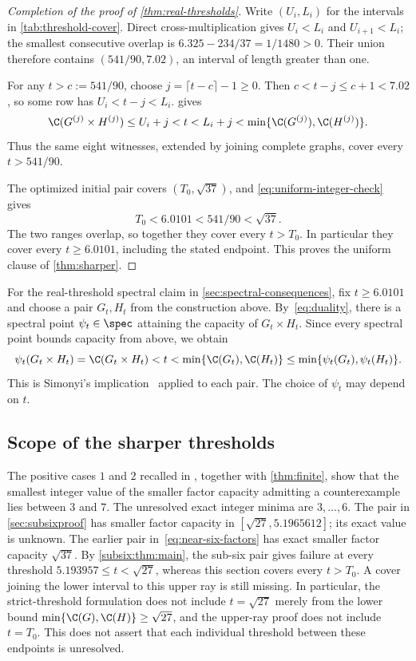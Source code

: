 \FloatBarrier
\begin{proof}[Completion of the proof of \cref{thm:real-thresholds}]
Write $(U_i,L_i)$ for the intervals in
\cref{tab:threshold-cover}. Direct cross-multiplication gives
$U_i<L_i$ and $U_{i+1}<L_i$; the smallest consecutive overlap
is $6.325-234/37=1/1480>0$. Their union therefore contains
$(541/90,7.02)$, an interval of length greater than one.

For any $t>c:=541/90$, choose $j=\lceil t-c\rceil-1\ge0$.
Then $c<t-j\le c+1<7.02$, so some row has $U_i<t-j<L_i$.
 gives
\[
 \C(G^{(j)}\times H^{(j)})\le U_i+j<t<L_i+j
 <\min\{\C(G^{(j)}),\C(H^{(j)})\}.
\]
Thus the same eight witnesses, extended by joining complete graphs,
cover every $t>541/90$.

The optimized initial pair covers $(T_0,\sqrt{37})$, and
\eqref{eq:uniform-integer-check} gives
\[
 T_0<6.0101<541/90<\sqrt{37}.
\]
The two ranges overlap, so together they cover every $t>T_0$.
In particular they cover every $t\ge6.0101$, including the stated
endpoint. This proves the uniform clause of \cref{thm:sharper}.
\end{proof}

For the real-threshold spectral claim in \cref{sec:spectral-consequences}, fix
$t\ge6.0101$ and choose a pair $G_t,H_t$ from the construction above.
By~\eqref{eq:duality}, there is a spectral point $\psi_t\in\spec$
attaining the capacity of $G_t\times H_t$. Since every spectral point
bounds capacity from above, we obtain
\[
 \psi_t(G_t\times H_t)=\C(G_t\times H_t)<t
 <\min\{\C(G_t),\C(H_t)\}
 \le\min\{\psi_t(G_t),\psi_t(H_t)\}.
\]
This is Simonyi's implication~\cite[Thm.~8]{Simonyi} applied to each
pair. The choice of $\psi_t$ may depend on $t$.

\subsection{Scope of the sharper thresholds}

The positive cases $1$ and $2$ recalled in ,
together with \cref{thm:finite}, show that the smallest integer value of
the smaller factor capacity admitting a counterexample lies between
$3$ and $7$. The unresolved exact integer minima are $3,\ldots,6$. The pair in
\cref{sec:subsixproof} has smaller factor capacity in
$[\sqrt{27},5.1965612]$; its exact value is unknown.
The earlier pair in~\eqref{eq:near-six-factors} has exact smaller
factor capacity $\sqrt{37}$.
By \cref{subsix:thm:main}, the sub-six pair gives failure at every
threshold $5.193957\le t<\sqrt{27}$, whereas this section covers
every $t>T_0$. A cover joining the lower interval to this upper ray
is still missing. In particular, the strict-threshold formulation
does not include $t=\sqrt{27}$ merely from the lower bound
$\min\{\C(G),\C(H)\}\ge\sqrt{27}$, and the upper-ray proof does not
include $t=T_0$. This does not assert that each individual threshold
between these endpoints is unresolved.

